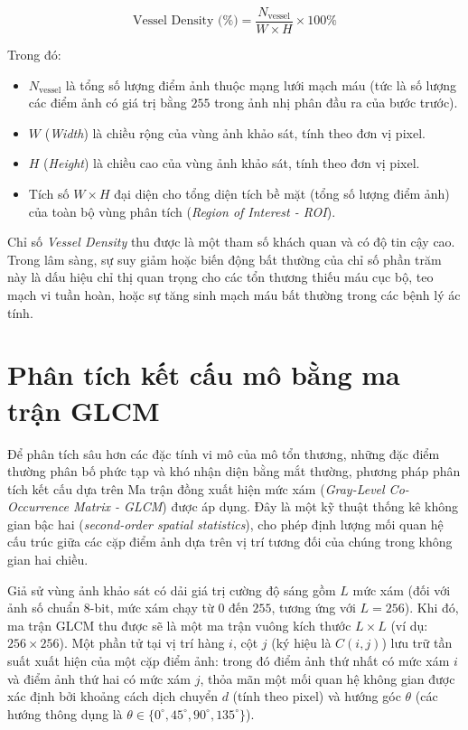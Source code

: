 \begin{equation}
\text{Vessel Density (\%)} = \frac{N_{\text{vessel}}}{W \times H} \times 100\%
\label{eq:vessel_density}
\end{equation}

Trong đó:
\begin{itemize}
    \item $N_{\text{vessel}}$ là tổng số lượng điểm ảnh thuộc mạng lưới mạch máu (tức là số lượng các điểm ảnh có giá trị bằng $255$ trong ảnh nhị phân đầu ra của bước trước).
    \item $W$ (\textit{Width}) là chiều rộng của vùng ảnh khảo sát, tính theo đơn vị pixel.
    \item $H$ (\textit{Height}) là chiều cao của vùng ảnh khảo sát, tính theo đơn vị pixel.
    \item Tích số $W \times H$ đại diện cho tổng diện tích bề mặt (tổng số lượng điểm ảnh) của toàn bộ vùng phân tích (\textit{Region of Interest - ROI}).
\end{itemize}

Chỉ số \textit{Vessel Density} thu được là một tham số khách quan và có độ tin cậy cao. Trong lâm sàng, sự suy giảm hoặc biến động bất thường của chỉ số phần trăm này là dấu hiệu chỉ thị quan trọng cho các tổn thương thiếu máu cục bộ, teo mạch vi tuần hoàn, hoặc sự tăng sinh mạch máu bất thường trong các bệnh lý ác tính.


\section{Phân tích kết cấu mô bằng ma trận GLCM}

Để phân tích sâu hơn các đặc tính vi mô của mô tổn thương, những đặc điểm thường phân bố phức tạp và khó nhận diện bằng mắt thường, phương pháp phân tích kết cấu dựa trên Ma trận đồng xuất hiện mức xám (\textit{Gray-Level Co-Occurrence Matrix - GLCM}) được áp dụng. Đây là một kỹ thuật thống kê không gian bậc hai (\textit{second-order spatial statistics}), cho phép định lượng mối quan hệ cấu trúc giữa các cặp điểm ảnh dựa trên vị trí tương đối của chúng trong không gian hai chiều.

Giả sử vùng ảnh khảo sát có dải giá trị cường độ sáng gồm $L$ mức xám (đối với ảnh số chuẩn 8-bit, mức xám chạy từ $0$ đến $255$, tương ứng với $L = 256$). Khi đó, ma trận GLCM thu được sẽ là một ma trận vuông kích thước $L \times L$ (ví dụ: $256 \times 256$). Một phần tử tại vị trí hàng $i$, cột $j$ (ký hiệu là $C(i, j)$) lưu trữ tần suất xuất hiện của một cặp điểm ảnh: trong đó điểm ảnh thứ nhất có mức xám $i$ và điểm ảnh thứ hai có mức xám $j$, thỏa mãn một mối quan hệ không gian được xác định bởi khoảng cách dịch chuyển $d$ (tính theo pixel) và hướng góc $\theta$ (các hướng thông dụng là $\theta \in \{0^\circ, 45^\circ, 90^\circ, 135^\circ\}$).

